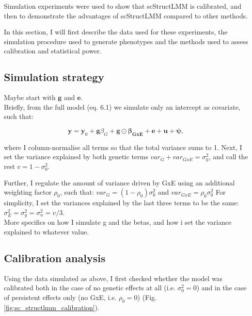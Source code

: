 
Simulation experiments were used to show that scStructLMM is calibrated, and then to demonstrate the 
advantages of scStructLMM compared to other methods. 

In this section, I will first describe the data used for these experiments, the simulation procedure used to generate phenotypes and the methods used to assess calibration and statistical power. 

\subsection{Simulation strategy}

Maybe start with $\mathbf{g}$ and $\mathbf{e}$.\\

Briefly, from the full model (eq. 6.1) we simulate only an intercept as covariate, such that:  

\begin{equation}
 \mathbf{y} = \mathbf{y}_0 + \mathbf{g}\beta_G + \mathbf{g} \odot \boldsymbol{\beta_{GxE}} + \mathbf{e} + \mathbf{u} + \boldsymbol{\psi}, 
\end{equation}

where I column-normalise all terms so that the total variance sums to 1.
Next, I set the variance explained by both genetic terms $var_G+var_{GxE}=\sigma_0^2$, and call the rest $v = 1-\sigma_0^2$.

Further, I regulate the amount of variance driven by GxE using an additional weighting factor $\rho_0$, such that: $var_G = (1-\rho_0)\sigma_0^2$ and $var_{GxE} = \rho_0\sigma_0^2$
For simplicity, I set the variances explained by the last three terms to be the same:
$\sigma_E^2 = \sigma_g^2 = \sigma_n^2 = v/3$. \\

More specifics on how I simulate g and the betas, and how i set the variance explained to whatever value.

\subsection{Calibration analysis}

Using the data simulated as above, I first checked whether the model was calibrated both in the case of no genetic effects at all (i.e. $\sigma_0^2 = 0$) and in the case of persistent effects only (no GxE, i.e. $\rho_0 = 0$) (Fig. \ref{fig:sc_structlmm_calibration}).

